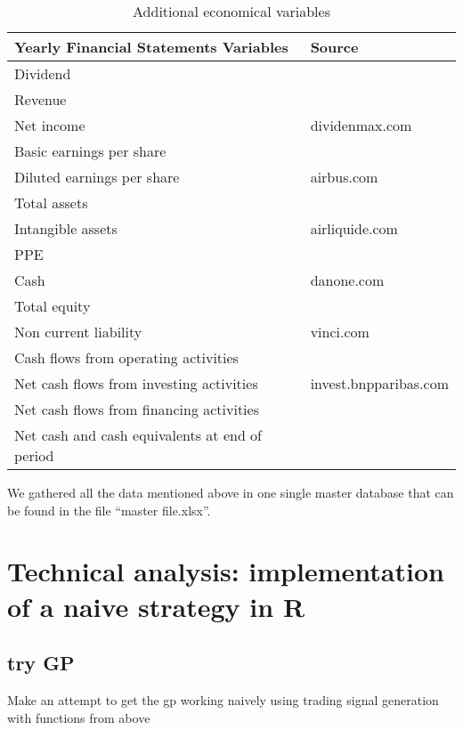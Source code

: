 \documentclass[
  11pt,
]{article}
\begin{document}
\begin{table}[H]

\caption{\label{tab:second_half}Additional economical variables}
\centering
\begin{tabular}[t]{ll}
\toprule
Yearly Financial
Statements Variables & Source\\
\midrule
Dividend & \\
Revenue & \\
Net income & dividenmax.com\\
Basic earnings
per share & \\
Diluted earnings
per share & airbus.com\\
\addlinespace
Total assets & \\
Intangible assets & airliquide.com\\
PPE & \\
Cash & danone.com\\
Total equity & \\
\addlinespace
Non current liability & vinci.com\\
Cash flows from operating activities & \\
Net cash flows from
investing activities & invest.bnpparibas.com\\
Net cash flows from
financing activities & \\
Net cash and cash
equivalents at end of period & \\
\bottomrule
\end{tabular}
\end{table}

We gathered all the data mentioned above in one single master database
that can be found in the file ``master file.xlsx''.

\newpage

\hypertarget{technical-analysis-implementation-of-a-naive-strategy-in-r}{%
\section{Technical analysis: implementation of a naive strategy in
R}\label{technical-analysis-implementation-of-a-naive-strategy-in-r}}

\hypertarget{try-gp}{%
\subsection{try GP}\label{try-gp}}

Make an attempt to get the gp working naively using trading signal
generation with functions from above
\end{document}
